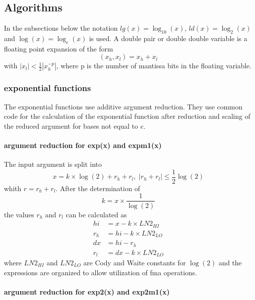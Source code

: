 \documentclass[10pt,a4paper,final,oneside]{article}
\numberwithin{equation}{subsection}
\begin{document}
\subsection{Algorithms}
In the subsections below the notation $ lg(x) = \log_{10}(x)$,
$ ld(x) = \log_2{(x)} $ and $ \log{(x)} = \log_e{(x)} $ is used. A double pair
or double double variable is a floating point expansion of the form
\[
    (x_h, x_l) = x_h + x_l
\]
with $ |x_l| < \frac{1}{2} |x_h^{-p}| $, where p is the number of mantissa
bits in the floating variable.
\subsubsection{exponential functions}
\label{sub_sec:expxxx}

The exponential functions use additive argument reduction.
They use common code for the calculation of the exponential function
after reduction and scaling of the reduced argument for bases not
equal to $e$.

\paragraph{argument reduction for exp(x) and expm1(x)}

    The input argument is split into
    \begin{equation}
        x = k \times \log{(2)} + r_h + r_l, \;
        |r_h +r_l| \le \frac{1}{2} \log{(2)}
    \end{equation}
    whith $r = r_h + r_l$.
    After the determination of
    \[
        k = x \times \frac{1}{\log{(2)}}
    \]
    the values $r_h$ and $r_l$ can be calculated as
    \[
       \begin{aligned}
       hi &= x - k \times LN2_{HI} \\
       r_h &= hi - k \times LN2_{LO} \\
       dx & = hi - r_h \\
       r_l &= dx - k \times LN2_{LO}
       \end{aligned}
    \]
    where $LN2_{HI}$ and $LN2_{LO}$ are Cody and Waite constants for $\log(2)$
    and the expressions are organized to allow utilization of fma operations.

\paragraph{argument reduction for exp2(x) and exp2m1(x)}
\end{document}
